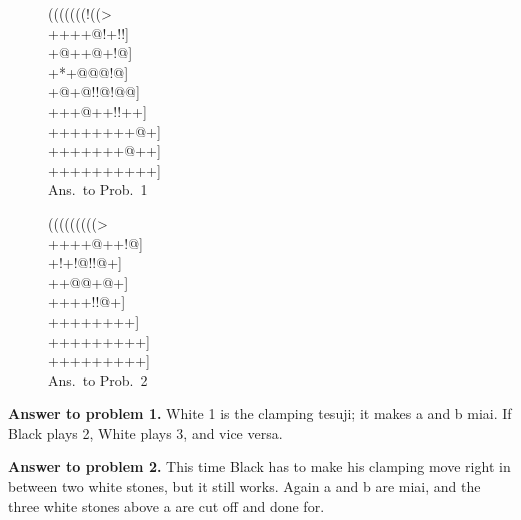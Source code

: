 \documentclass[mcrownvopaper,10pt,twopage,onecolumn,final]{memoir}
\begin{document}
\begin{figure}[ht]
    \begin{minipage}[c]{0.50\linewidth}
        \centering    
        {\gnos%
        (((((((!((>\\
        ++++{\gnosw{}}@!+!!]\\
        +@++{\gnosw{}}{\gnosb{}}@+!@]\\
        +*+@@@!@]\\
        +@+@!!@!@@]\\
        +++@++!!++]\\
        ++++++++@+]\\
        +++++++@++]\\
        ++++++++++]\\
        }
        Ans.\ to Prob.\ 1
    \end{minipage}%
    \begin{minipage}[c]{0.50\linewidth}
        \centering    
                {\gnos%
        (((((((((>\\
        ++++@++!@]\\
        +!+!@!!@+]\\
        ++@@+@+]\\
        ++++!{\gnosb{}}!@+]\\
        ++++++++]\\
        +++++++++]\\
        +++++++++]\\
        }
        Ans.\ to Prob.\ 2
    \end{minipage}%
\end{figure}  
\noindent
\textbf{Answer to problem 1.} White 1 is the clamping tesuji; it makes a and b
miai. If Black plays 2, White plays 3, and vice versa.

\noindent
\textbf{Answer to problem 2.} This time Black has to make his clamping move
right in between two white stones, but it still works. Again a and b are
miai, and the three white stones above a are cut off and done for.
\end{document}
